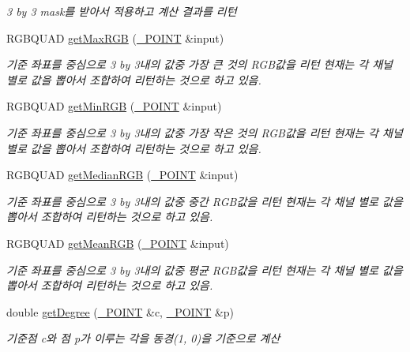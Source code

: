 \begin{DoxyCompactItemize}
\begin{DoxyCompactList}\small\item\em 3 by 3 mask를 받아서 적용하고 계산 결과를 리턴 \end{DoxyCompactList}\item 
R\-G\-B\-Q\-U\-A\-D \hyperlink{class_my_image_a67139f04c5ab4bb113874b7f3d10de3d}{get\-Max\-R\-G\-B} (\hyperlink{class___p_o_i_n_t}{\-\_\-\-P\-O\-I\-N\-T} \&input)
\begin{DoxyCompactList}\small\item\em 기준 좌표를 중심으로 3 by 3내의 값중 가장 큰 것의 R\-G\-B값을 리턴 현재는 각 채널 별로 값을 뽑아서 조합하여 리턴하는 것으로 하고 있음. \end{DoxyCompactList}\item 
R\-G\-B\-Q\-U\-A\-D \hyperlink{class_my_image_abf923f02f9ff7fb47dd87e716f0afac9}{get\-Min\-R\-G\-B} (\hyperlink{class___p_o_i_n_t}{\-\_\-\-P\-O\-I\-N\-T} \&input)
\begin{DoxyCompactList}\small\item\em 기준 좌표를 중심으로 3 by 3내의 값중 가장 작은 것의 R\-G\-B값을 리턴 현재는 각 채널 별로 값을 뽑아서 조합하여 리턴하는 것으로 하고 있음. \end{DoxyCompactList}\item 
R\-G\-B\-Q\-U\-A\-D \hyperlink{class_my_image_a2e9eda07e542c7d166a9b51df8f57d04}{get\-Median\-R\-G\-B} (\hyperlink{class___p_o_i_n_t}{\-\_\-\-P\-O\-I\-N\-T} \&input)
\begin{DoxyCompactList}\small\item\em 기준 좌표를 중심으로 3 by 3내의 값중 중간 R\-G\-B값을 리턴 현재는 각 채널 별로 값을 뽑아서 조합하여 리턴하는 것으로 하고 있음. \end{DoxyCompactList}\item 
R\-G\-B\-Q\-U\-A\-D \hyperlink{class_my_image_a454bd6266ccaa80824c25374bb49411b}{get\-Mean\-R\-G\-B} (\hyperlink{class___p_o_i_n_t}{\-\_\-\-P\-O\-I\-N\-T} \&input)
\begin{DoxyCompactList}\small\item\em 기준 좌표를 중심으로 3 by 3내의 값중 평균 R\-G\-B값을 리턴 현재는 각 채널 별로 값을 뽑아서 조합하여 리턴하는 것으로 하고 있음. \end{DoxyCompactList}\item 
double \hyperlink{class_my_image_a2ee075ed79cf8759bcaa5efa2e145ef5}{get\-Degree} (\hyperlink{class___p_o_i_n_t}{\-\_\-\-P\-O\-I\-N\-T} \&c, \hyperlink{class___p_o_i_n_t}{\-\_\-\-P\-O\-I\-N\-T} \&p)
\begin{DoxyCompactList}\small\item\em 기준점 c와 점 p가 이루는 각을 동경(1, 0)을 기준으로 계산 \end{DoxyCompactList}\end{DoxyCompactItemize}
